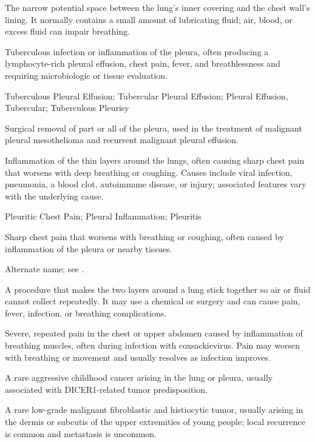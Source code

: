  The narrow potential space between the lung’s inner covering and the chest wall’s lining. It normally contains a small amount of lubricating fluid; air, blood, or excess fluid can impair breathing.

 Tuberculous infection or inflammation of the pleura, often producing a lymphocyte-rich pleural effusion, chest pain, fever, and breathlessness and requiring microbiologic or tissue evaluation.

\synonyms
Tuberculous Pleural Effusion; Tubercular Pleural Effusion; Pleural Effusion, Tubercular; Tuberculous Pleurisy

 Surgical removal of part or all of the pleura, used in the treatment of malignant
pleural mesothelioma and recurrent malignant pleural effusion.

 Inflammation of the thin layers around the lungs, often causing sharp chest pain that worsens with deep breathing or coughing. Causes include viral infection, pneumonia, a blood clot, autoimmune disease, or injury; associated features vary with the underlying cause.

\synonyms
Pleuritic Chest Pain; Pleural Inflammation; Pleuritis

 Sharp chest pain that worsens with breathing or coughing, often caused by inflammation of the pleura or nearby tissues.

 Alternate name; see .

 A procedure that makes the two layers around a lung stick together so air or fluid cannot collect repeatedly. It may use a chemical or surgery and can cause pain, fever, infection, or breathing complications.

 Severe, repeated pain in the chest or upper abdomen caused by inflammation of breathing muscles, often during infection with coxsackievirus. Pain may worsen with breathing or movement and usually resolves as infection improves.

 A rare aggressive childhood cancer arising in the lung or pleura, usually associated with DICER1-related tumor predisposition.

 A rare low-grade malignant fibroblastic and histiocytic tumor, usually arising in the dermis or subcutis of the upper extremities of young people; local recurrence is common and metastasis is uncommon.

